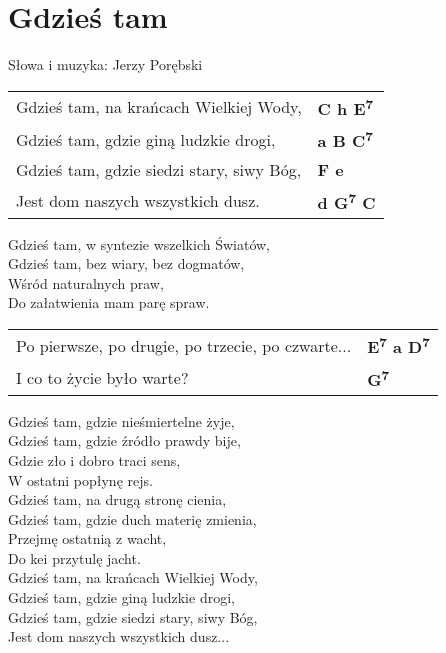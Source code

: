 \section{Gdzieś tam}

Słowa i muzyka: Jerzy Porębski

\vspace{2em}
\begin{tabular}{@{}p{8cm}@{}l@{}}
Gdzieś tam, na krańcach Wielkiej Wody, & \bfseries C h E\textsuperscript{7}\\
Gdzieś tam, gdzie giną ludzkie drogi, & \bfseries a B C\textsuperscript{7}\\
Gdzieś tam, gdzie siedzi stary, siwy Bóg, & \bfseries F e\\
Jest dom naszych wszystkich dusz. & \bfseries d G\textsuperscript{7} C\\
\end{tabular}

\vspace{1em}
Gdzieś tam, w syntezie wszelkich Światów, \\
Gdzieś tam, bez wiary, bez dogmatów, \\
Wśród naturalnych praw, \\
Do załatwienia mam parę spraw. \\

\vspace{2em}
\begin{tabular}{@{}p{8cm}@{}l@{}}
Po pierwsze, po drugie, po trzecie, po czwarte... & \bfseries E\textsuperscript{7} a D\textsuperscript{7}\\
I co to życie było warte? & \bfseries G\textsuperscript{7}\\
\end{tabular}

\vspace{1em}
Gdzieś tam, gdzie nieśmiertelne żyje, \\
Gdzieś tam, gdzie źródło prawdy bije, \\
Gdzie zło i dobro traci sens, \\
W ostatni popłynę rejs. \\

Gdzieś tam, na drugą stronę cienia, \\
Gdzieś tam, gdzie duch materię zmienia, \\
Przejmę ostatnią z wacht, \\
Do kei przytulę jacht. \\

Gdzieś tam, na krańcach Wielkiej Wody, \\
Gdzieś tam, gdzie giną ludzkie drogi, \\
Gdzieś tam, gdzie siedzi stary, siwy Bóg, \\
Jest dom naszych wszystkich dusz... \\